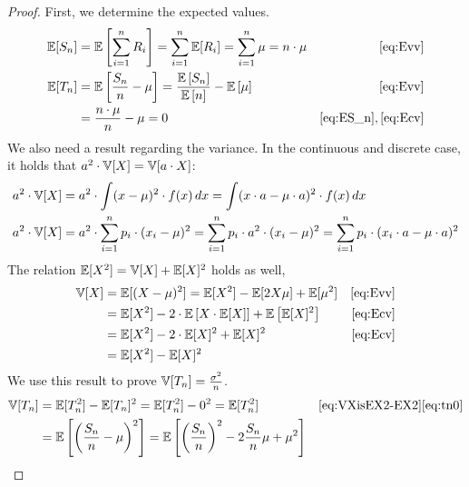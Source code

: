 \begin{proof}
  First, we determine the expected values.
  \begin{align}
      \mathbb E[S_n] &= \mathbb E\left[\sum_{i=1}^n R_i\right] = \sum_{i=1}^n \mathbb E[R_i] = \sum_{i=1}^n \mu = n \cdot \mu & \eqref{eq:Evv} \label{eq:ES_n} \\
      \mathbb E[T_n] &= \mathbb E\left[\frac{S_n}{n} - \mu\right] = \frac{\mathbb E\left[S_n\right]}{\mathbb E\left[n\right]} - \mathbb E\left[\mu\right] & \eqref{eq:Evv} \notag\\
              &= \frac{n \cdot \mu}{n} - \mu = 0  & \eqref{eq:ES_n}, \eqref{eq:Ecv} \label{eq:tn0}
  \end{align}
  We also need a result regarding the variance.
  In the continuous and discrete case, it holds that $a^2 \cdot \mathbb V[X] = \mathbb V[a \cdot X]$:
  \begin{align}
    a^2 \cdot \mathbb V[X] &= a^2 \cdot \int (x - \mu)^2 \cdot f(x) \, dx = \int (x \cdot a - \mu \cdot a)^2 \cdot f(x) \, dx \notag \\
    a^2 \cdot \mathbb V[X] &= a^2 \cdot \sum_{i=1}^n p_i \cdot (x_i - \mu)^2 = \sum_{i=1}^n p_i \cdot a^2 \cdot (x_i - \mu)^2 = \sum_{i=1}^n p_i \cdot (x_i \cdot a - \mu \cdot a)^2 \label{eq:a2V}
  \end{align}
  The relation $\mathbb E[X^2] = \mathbb V[X] + \mathbb E[X]^2$ holds as well,
  \begin{align}
    \mathbb V[X] &= \mathbb E[(X - \mu)^2] = \mathbb E[X^2] - \mathbb E[2X\mu] + \mathbb E[\mu^2] \notag & \eqref{eq:Evv} \\
            &= \mathbb E[X^2] - 2 \cdot \mathbb E\left[X \cdot \mathbb E[X]\right] + \mathbb E\left[\mathbb E[X]^2\right] & \eqref{eq:Ecv} \notag\\
            &= \mathbb E[X^2] - 2 \cdot \mathbb E[X]^2 + \mathbb E[X]^2 & \eqref{eq:Ecv} \notag\\
            &= \mathbb E[X^2] - \mathbb E[X]^2 \label{eq:VXisEX2-EX2}
  \end{align}
  We use this result to prove $\mathbb V[T_n] = \frac{\sigma^2}{n}$.
  \begin{align}
    \Var[T_n] &= \E[T_n^2] - \E[T_n]^2 = \E[T_n^2] - 0^2 = \E[T_n^2] & \eqref{eq:VXisEX2-EX2} \eqref{eq:tn0} \notag\\
              &= \E\left[\left(\frac{S_n}{n} - \mu\right)^2\right] = \E\left[\left(\frac{S_n}{n}\right)^2 - 2\frac{S_n}{n}\mu + \mu^2\right] \notag \\

\end{align}
\end{proof}
